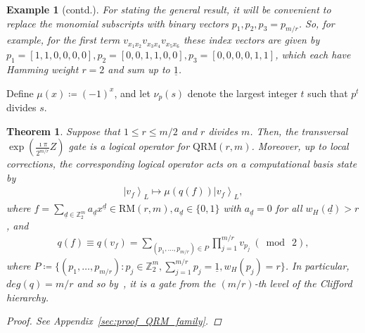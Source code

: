 \documentclass[twoside,romanappendices]{IEEEtran}
\newtheorem{theorem}{Theorem}
\newtheorem{example}{Example}
\newcommand{\ket}[1]{\left\lvert #1 \right\rangle}
\newcommand{\vecnot}[1]{\underline{#1}}
\begin{document}
\begin{example}[contd.]
For stating the general result, it will be convenient to replace the monomial subscripts with binary vectors $p_1, p_2, p_3 = p_{m/r}$. 
So, for example, for the first term $v_{x_1 x_2} v_{x_3 x_4} v_{x_5 x_6}$ these index vectors are given by $p_1 = [1,1,0,0,0,0], p_2 = [0,0,1,1,0,0], p_3 = [0,0,0,0,1,1]$, which each have Hamming weight $r = 2$ and sum up to $\vecnot{1}$.
\end{example}


Define $\mu(x) \coloneqq (-1)^x$, and let $\nu_p(s)$ denote the largest integer $t$ such that $p^t$ divides $s$.


\begin{theorem} 
\label{thm:QRM_family}
Suppose that $1 \leq r \leq m/2$ and $r$ divides $m$.  
Then, the transversal $\exp\left( \frac{\imath\pi}{2^{m/r}} Z \right)$ gate is a logical operator for $\text{QRM}(r,m)$.  
Moreover, up to local corrections, the corresponding logical operator acts on a computational basis state by
\begin{align}
\label{eq:QRM_family_logical_action}
\ket{v_f}_L \mapsto \mu(q(f))\ket{v_f}_L,
\end{align} 
where $f = \sum_{\vecnot{d} \in \mathbb{Z}_2^m} a_{\vecnot{d}} x^{\vecnot{d}} \in \text{RM}(r,m), a_{\vecnot{d}} \in \{0,1\}$ with $a_{\vecnot{d}} = 0$ for all $w_H(\vecnot{d}) > r$, and 
\begin{align}
\label{eq:QRM_thm_poly}
q(f) \equiv q(v_f) = \sum_{(p_1,\ldots,p_{m/r}) \in P} \prod_{j = 1}^{m/r} v_{p_j} \ (\bmod\ 2),
\end{align}
where $P \coloneqq \{ (p_1,\ldots,p_{m/r}) \colon p_j \in \mathbb{Z}_2^m, \sum_{j=1}^{m/r} p_j = \vecnot{1}, w_H(p_j) = r \}$.
In particular, $deg(q) = m/r$ and so by~\cite{Cui-physreva17}, it is a gate from the $(m/r)$-th level of the Clifford hierarchy.
\begin{proof}
See Appendix~\ref{sec:proof_QRM_family}.
\end{proof}
\end{theorem}
\end{document}
